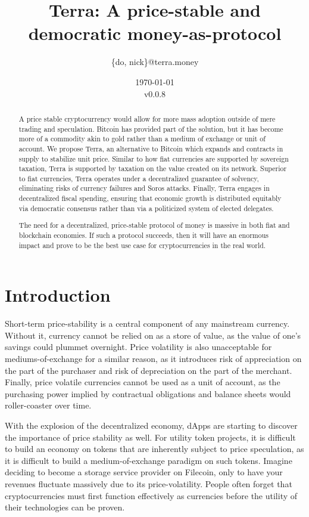 \documentclass{article}
\title{Terra: A price-stable and democratic money-as-protocol}
\author{\{do, nick\}@terra.money}
\date{\today \\v0.0.8}
\begin{document}
\maketitle

\begin{abstract}
A price stable cryptocurrency would allow for more mass adoption outside of mere trading and speculation. Bitcoin has provided part of the solution, but it has become more of a commodity akin to gold rather than a medium of exchange or unit of account. We propose Terra, an alternative to Bitcoin which expands and contracts in supply to stabilize unit price. Similar to how fiat currencies are supported by sovereign taxation, Terra is supported by taxation  on the value created on its network. Superior to fiat currencies, Terra operates under a decentralized guarantee of solvency, eliminating risks of currency failures and Soros attacks. Finally, Terra engages in decentralized fiscal spending, ensuring that economic growth is distributed equitably via democratic consensus rather than via a politicized system of elected delegates. 

The need for a decentralized, price-stable protocol of money is massive in both fiat and blockchain economies. If such a protocol succeeds, then it will have an enormous impact and prove to be the best use case for cryptocurrencies in the real world. 

\end{abstract}

\pagebreak
\tableofcontents
\pagebreak

\section{Introduction}

Short-term price-stability is a central component of any mainstream currency. Without it, currency cannot be relied on as a store of value, as the value of one's savings could plummet overnight. Price volatility is also unacceptable for mediums-of-exchange for a similar reason, as it introduces risk of appreciation on the part of the purchaser and risk of depreciation on the part of the merchant. Finally, price volatile currencies cannot be used as a unit of account, as the purchasing power implied by contractual obligations and balance sheets would roller-coaster over time. 

With the explosion of the decentralized economy, dApps are starting to discover the importance of price stability as well. For utility token projects, it is difficult to build an economy on tokens that are inherently subject to price speculation, as it is difficult to build a medium-of-exchange paradigm on such tokens. Imagine deciding to become a storage service provider on Filecoin, only to have your revenues fluctuate massively due to its price-volatility. People often forget that cryptocurrencies must first function effectively as currencies before the utility of their technologies can be proven. 
\end{document}
